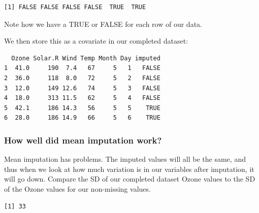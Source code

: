 \documentclass[
  letterpaper,
  DIV=11,
  numbers=noendperiod]{scrreprt}
\newenvironment{Shaded}{\begin{snugshade}}{\end{snugshade}}
\newcommand{\AttributeTok}[1]{\textcolor[rgb]{0.49,0.56,0.16}{#1}}
\newcommand{\ConstantTok}[1]{\textcolor[rgb]{0.53,0.00,0.00}{#1}}
\newcommand{\FunctionTok}[1]{\textcolor[rgb]{0.02,0.16,0.49}{#1}}
\newcommand{\NormalTok}[1]{\textcolor[rgb]{0.00,0.44,0.13}{#1}}
\newcommand{\OtherTok}[1]{\textcolor[rgb]{0.00,0.44,0.13}{#1}}
\newcommand{\SpecialCharTok}[1]{\textcolor[rgb]{0.25,0.44,0.63}{#1}}
\begin{document}
\begin{verbatim}
[1] FALSE FALSE FALSE FALSE  TRUE  TRUE
\end{verbatim}

Note how we have a TRUE or FALSE for each row of our data.

We then store this as a covariate in our completed dataset:

\begin{Shaded}
\end{Shaded}

\begin{verbatim}
  Ozone Solar.R Wind Temp Month Day imputed
1  41.0     190  7.4   67     5   1   FALSE
2  36.0     118  8.0   72     5   2   FALSE
3  12.0     149 12.6   74     5   3   FALSE
4  18.0     313 11.5   62     5   4   FALSE
5  42.1     186 14.3   56     5   5    TRUE
6  28.0     186 14.9   66     5   6    TRUE
\end{verbatim}

\hypertarget{how-well-did-mean-imputation-work}{%
\subsubsection{How well did mean imputation
work?}\label{how-well-did-mean-imputation-work}}

Mean imputation has problems. The imputed values will all be the same,
and thus when we look at how much variation is in our variables after
imputation, it will go down. Compare the SD of our completed dataset
Ozone values to the SD of the Ozone values for our non-missing values.

\begin{Shaded}
\end{Shaded}

\begin{verbatim}
[1] 33
\end{verbatim}

\begin{Shaded}
\end{Shaded}
\end{document}
